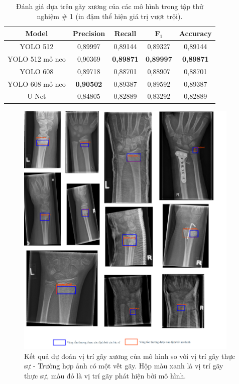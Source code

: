 \documentclass[../the.tex]{subfiles}
\begin{document}

\begin{table}[h!]
\centering
\caption{Đánh giá dựa trên gãy xương của các mô hình trong tập thử nghiệm \# 1 (in đậm thể hiện giá trị vượt trội).}
\begin{tabular}{|c|c|c|c|c|}
\hline
\textbf{Model}
& \textbf{Precision}
& \textbf{Recall}  
& \textbf{F$_{1}$} 
& \textbf{Accuracy} 
\\ \hline 
YOLO 512           & 0,89997       & 0,89144   & 0,89327    & 0,89144     \\  \hline
YOLO 512 mỏ neo   & 0,90369       & \textbf{0,89871}   & \textbf{0,89997}    & \textbf{0,89871}     \\  \hline
YOLO 608           & 0,89718       & 0,88701   & 0,88907    & 0,88701     \\  \hline
YOLO 608 mỏ neo   & \textbf{0,90502}       & 0,89387   & 0,89592    & 0,89387     \\  \hline
U-Net              & 0,84805       & 0,82889   & 0,83292    & 0,82889     \\  \hline

\end{tabular}
\label{tab:frac}
\end{table}

\begin{figure}[H]
\centering
	\includegraphics[width=0.95\textwidth]{images/predict_1.png}
	\caption{Kết quả dự đoán vị trí gãy xương của mô hình so với vị trí gãy thực sự - Trường hợp ảnh có một vết gãy. Hộp màu xanh là vị trí gãy thực sự, màu đỏ là vị trí gãy phát hiện bởi mô hình.}
	\label{fig:predict_1}
\end{figure}
\end{document}
